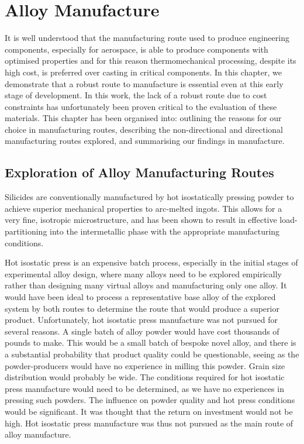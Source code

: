 \chapter{Alloy Manufacture}

It is well understood that the manufacturing route used to produce engineering components, especially for aerospace, is able to produce components with optimised properties and for this reason thermomechanical processing, despite its high cost, is preferred over casting in critical components.  In this chapter, we demonstrate that a robust route to manufacture is essential even at this early stage of development.  In this work, the lack of a robust route due to cost constraints has unfortunately been proven critical to the evaluation of these materials.  This chapter has been organised into: outlining the reasons for our choice in manufacturing routes, describing the non-directional and directional manufacturing routes explored, and summarising our findings in manufacture.

\section{Exploration of Alloy Manufacturing Routes}

Silicides are conventionally manufactured by hot isostatically pressing powder to achieve superior mechanical properties to arc-melted ingots.  This allows for a very fine, isotropic microstructure, and has been shown to result in effective load-partitioning into the intermetallic phase with the appropriate manufacturing conditions. 

Hot isostatic press is an expensive batch process, especially in the initial stages of experimental alloy design, where many alloys need to be explored empirically rather than designing many virtual alloys and manufacturing only one alloy.  It would have been ideal to process a representative base alloy of the explored system by both routes to determine the route that would produce a superior product.  Unfortunately, hot isostatic press manufacture was not pursued for several reasons.  A single batch of alloy powder would have cost thousands of pounds to make.  This would be a small batch of bespoke novel alloy, and there is a substantial probability that product quality could be questionable, seeing as the powder-producers would have no experience in milling this powder.  Grain size distribution would probably be wide.  The conditions required for hot isostatic press manufacture would need to be determined, as we have no experiences in pressing such powders.  The influence on powder quality and hot press conditions would be significant.  It was thought that the return on investment would not be high.  Hot isostatic press manufacture was thus not pursued as the main route of alloy manufacture.

